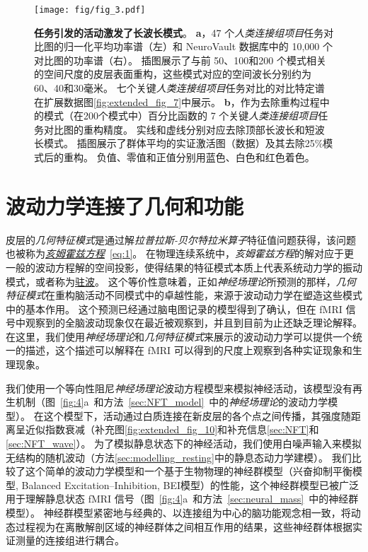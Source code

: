 \documentclass[lang=cn,a4paper,newtx,citestyle=gb7714-2015, bibstyle=gb7714-2015]{elegantpaper}
\begin{document}
\begin{figure}[!htb]
	\centering
	\texttt{[image: fig/fig\_3.pdf]}
	\caption{\textbf{任务引发的活动激发了长波长模式}。
	\textbf{a}，47 个\textit{人类连接组项目}任务对比图的归一化平均功率谱（左）和 NeuroVault 数据库中的 10,000 个对比图的功率谱（右）。
	插图展示了与前 50、100和200 个模式相关的空间尺度的皮层表面重构，这些模式对应的空间波长分别约为 60、40和30毫米。
	七个关键\textit{人类连接组项目}任务对比的对比特定谱在扩展数据图\ref{fig:extended_fig_7}中展示。 
	\textbf{b}，作为去除重构过程中的模式（在200个模式中）百分比函数的 7 个关键\textit{人类连接组项目}任务对比图的重构精度。
	实线和虚线分别对应去除顶部长波长和短波长模式。
	插图展示了群体平均的实证激活图（数据）及其去除25\%模式后的重构。
	负值、零值和正值分别用蓝色、白色和红色着色。
	} \label{fig:3}
\end{figure}



\section{波动力学连接了几何和功能}

皮层的\textit{几何特征模式}是通过解\textit{拉普拉斯-贝尔特拉米算子}特征值问题获得，该问题也被称为\href{https://baike.baidu.com/item/%E4%BA%A5%E5%A7%86%E9%9C%8D%E5%85%B9%E6%96%B9%E7%A8%8B}{\textit{亥姆霍兹方程}}~\ref{eq:1}。
在物理连续系统中，\textit{亥姆霍兹方程}的解对应于更一般的波动方程解的空间投影，使得结果的特征模式本质上代表系统动力学的振动模式，或者称为\href{https://baike.baidu.com/item/%E9%A9%BB%E6%B3%A2}{驻波}。
这个等价性意味着，正如\textit{神经场理论}所预测的那样，\textit{几何特征模式}在重构脑活动不同模式中的卓越性能，来源于波动动力学在塑造这些模式中的基本作用。
这个预测已经通过脑电图记录的模型得到了确认，但在 fMRI 信号中观察到的全脑波动现象仅在最近被观察到，并且到目前为止还缺乏理论解释。
在这里，我们使用\textit{神经场理论}和\textit{几何特征模式}来展示的波动动力学可以提供一个统一的描述，这个描述可以解释在 fMRI 可以得到的尺度上观察到各种实证现象和生理现象。


我们使用一个等向性阻尼\textit{神经场理论}波动方程模型来模拟神经活动，该模型没有再生机制\cite{robinson1997propagation}（图~\ref{fig:4}a~和方法~\ref{sec:NFT_model}~中的\textit{神经场理论}的波动力学模型）。
在这个模型下，活动通过白质连接在新皮层的各个点之间传播，其强度随距离呈近似指数衰减（补充图\ref{fig:extended_fig_10}和补充信息\ref{sec:NFT}和\ref{sec:NFT_wave}）。
为了模拟静息状态下的神经活动，我们使用白噪声输入来模拟无结构的随机波动（方法\ref{sec:modelling_resting}中的静息态动力学建模）。
我们比较了这个简单的波动力学模型和一个基于生物物理的神经群模型（兴奋抑制平衡模型, Balanced Excitation–Inhibition, BEI模型）的性能，这个神经群模型已被广泛用于理解静息状态 fMRI 信号\cite{deco2014local}（图~\ref{fig:4}a~和方法~\ref{sec:neural_mass}~中的神经群模型）。
神经群模型紧密地与经典的、以连接组为中心的脑功能观念相一致，将动态过程视为在离散解剖区域的神经群体之间相互作用的结果，这些神经群体根据实证测量的连接组进行耦合。
\end{document}
